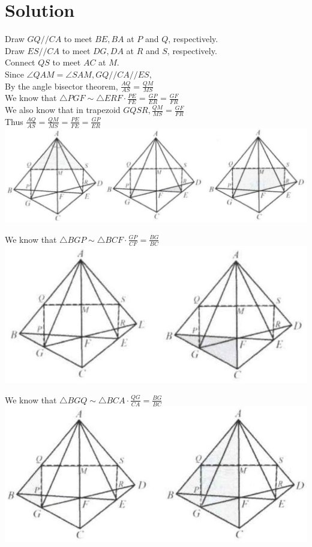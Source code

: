 \documentclass{article}
\begin{document}
\section*{Solution}
Draw \(G Q / / C A\) to meet \(B E, B A\) at \(P\) and \(Q\), respectively.\\
Draw \(E S / / C A\) to meet \(D G, D A\) at \(R\) and \(S\), respectively.\\
Connect \(Q S\) to meet \(A C\) at \(M\).\\
Since \(\angle Q A M=\angle S A M, G Q / / C A / / E S\),\\
By the angle bisector theorem, \(\frac{A Q}{A S}=\frac{Q M}{M S}\)\\
We know that \(\triangle P G F \sim \triangle E R F \cdot \frac{P E}{F E}=\frac{G P}{E R}=\frac{G F}{F R}\)\\
We also know that in trapezoid \(G Q S R, \frac{Q M}{M S}=\frac{G F}{F R}\)\\
Thus \(\frac{A Q}{A S}=\frac{Q M}{M S}=\frac{P E}{F E}=\frac{G P}{E R}\)\\
\centering
\includegraphics[width=\textwidth]{images/143.jpg}

We know that \(\triangle B G P \sim \triangle B C F \cdot \frac{G P}{C F}=\frac{B G}{B C}\)\\
\centering
\includegraphics[width=\textwidth]{images/143(1).jpg}


We know that \(\triangle B G Q \sim \triangle B C A \cdot \frac{Q G}{C A}=\frac{B G}{B C}\)\\
\centering
\includegraphics[width=\textwidth]{images/144(2).jpg}
\end{document}
